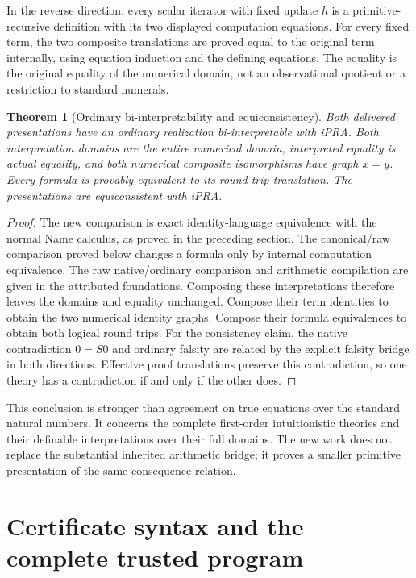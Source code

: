 \documentclass[11pt,letterpaper]{article}
\newtheorem{theorem}{Theorem}[section]
\theoremstyle{definition}\newtheorem{definition}[theorem]{Definition}
\theoremstyle{remark}\newtheorem{remark}[theorem]{Remark}
\begin{document}
In the reverse direction, every scalar iterator with fixed update $h$ is a
primitive-recursive definition with its two displayed computation equations.
For every fixed term, the two composite translations are proved equal to
the original term internally, using equation induction and the defining
equations. The equality is the original equality of the numerical domain,
not an observational quotient or a restriction to standard numerals.

\begin{theorem}[Ordinary bi-interpretability and equiconsistency]
Both delivered presentations have an ordinary realization bi-interpretable
with iPRA. Both interpretation domains are the entire numerical domain,
interpreted equality is actual equality, and both numerical composite
isomorphisms have graph $x=y$. Every formula is provably equivalent to its
round-trip translation. The presentations are equiconsistent with iPRA.
\end{theorem}
\begin{proof}
The new comparison is exact identity-language equivalence with the normal
Name calculus, as proved in the preceding section. The canonical/raw
comparison proved below changes a formula only by internal computation
equivalence. The raw native/ordinary comparison and arithmetic compilation
are given in the attributed foundations. Composing these interpretations
therefore leaves the domains and equality unchanged. Compose their term
identities to obtain the two numerical identity graphs. Compose their
formula equivalences to obtain both logical round trips. For the consistency
claim, the native contradiction $0=S0$ and ordinary falsity are related by
the explicit falsity bridge in both directions. Effective proof translations
preserve this contradiction, so one theory has a contradiction if and only
if the other does.
\end{proof}

This conclusion is stronger than agreement on true equations over the
standard natural numbers. It concerns the complete first-order intuitionistic
theories and their definable interpretations over their full domains.
The new work does not replace the substantial inherited arithmetic bridge;
it proves a smaller primitive presentation of the same consequence relation.


\section{Certificate syntax and the complete trusted program}
\label{sec:implementation}
\end{document}
